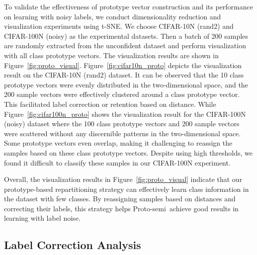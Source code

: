 \documentclass[letterpaper]{article} %
\newcommand{\method}{Proto-semi}
\begin{document}
To validate the effectiveness of prototype vector construction and its performance on learning with noisy labels,
we conduct dimensionality reduction and visualization experiments using t-SNE.
We choose CIFAR-10N (rand2) and CIFAR-100N (noisy) as the experimental datasets.
Then a batch of 200 samples are randomly extracted from the unconfident dataset and perform visualization with all class prototype vectors.
The visualization results are shown in Figure~\ref{fig:proto_visual}.
Figure~\ref{fig:cifar10n_proto} depicts the visualization result on the CIFAR-10N (rand2) dataset.
It can be observed that the 10 class prototype vectors were evenly distributed in the two-dimensional space,
and the 200 sample vectors were effectively clustered around a class prototype vector. This facilitated label correction or retention based on distance.
While Figure~\ref{fig:cifar100n_proto} shows the visualization result for the CIFAR-100N (noisy) dataset where the 100 class prototype vectors and 200 sample vectors were scattered without any discernible patterns in the two-dimensional space.
Some prototype vectors even overlap, making it challenging to reassign the samples based on these class prototype vectors.
Despite using high thresholds, we found it difficult to classify these samples in our CIFAR-100N experiment.

Overall, the visualization results in Figure~\ref{fig:proto_visual} indicate that our prototype-based repartitioning strategy can effectively learn class information in the dataset with few classes. By reassigning samples based on distances and correcting their labels, this strategy helps \method\ achieve good results in learning with label noise.






\subsection{Label Correction Analysis}\label{sec:label_correct}
\end{document}
